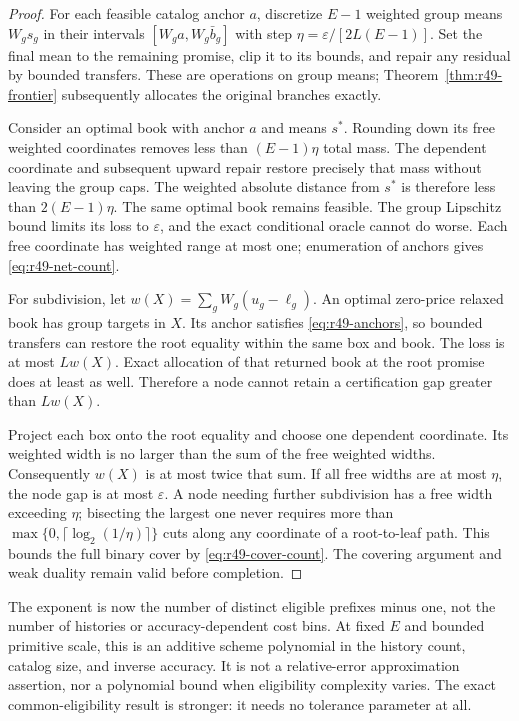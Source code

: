 \begin{proof}
For each feasible catalog anchor $a$, discretize $E-1$ weighted group means $W_gs_g$ in their intervals $[W_ga,W_g\bar b_g]$ with step $\eta=\varepsilon/[2L(E-1)]$. Set the final mean to the remaining promise, clip it to its bounds, and repair any residual by bounded transfers. These are operations on group means; Theorem~\ref{thm:r49-frontier} subsequently allocates the original branches exactly.

Consider an optimal book with anchor $a$ and means $s^*$. Rounding down its free weighted coordinates removes less than $(E-1)\eta$ total mass. The dependent coordinate and subsequent upward repair restore precisely that mass without leaving the group caps. The weighted absolute distance from $s^*$ is therefore less than $2(E-1)\eta$. The same optimal book remains feasible. The group Lipschitz bound limits its loss to $\varepsilon$, and the exact conditional oracle cannot do worse. Each free coordinate has weighted range at most one; enumeration of anchors gives \eqref{eq:r49-net-count}.

For subdivision, let $w(X)=\sum_gW_g(u_g-\ell_g)$. An optimal zero-price relaxed book has group targets in $X$. Its anchor satisfies \eqref{eq:r49-anchors}, so bounded transfers can restore the root equality within the same box and book. The loss is at most $Lw(X)$. Exact allocation of that returned book at the root promise does at least as well. Therefore a node cannot retain a certification gap greater than $Lw(X)$.

Project each box onto the root equality and choose one dependent coordinate. Its weighted width is no larger than the sum of the free weighted widths. Consequently $w(X)$ is at most twice that sum. If all free widths are at most $\eta$, the node gap is at most $\varepsilon$. A node needing further subdivision has a free width exceeding $\eta$; bisecting the largest one never requires more than $\max\{0,\lceil\log_2(1/\eta)\rceil\}$ cuts along any coordinate of a root-to-leaf path. This bounds the full binary cover by \eqref{eq:r49-cover-count}. The covering argument and weak duality remain valid before completion.\end{proof}

The exponent is now the number of distinct eligible prefixes minus one, not the number of histories or accuracy-dependent cost bins. At fixed $E$ and bounded primitive scale, this is an additive scheme polynomial in the history count, catalog size, and inverse accuracy. It is not a relative-error approximation assertion, nor a polynomial bound when eligibility complexity varies. The exact common-eligibility result is stronger: it needs no tolerance parameter at all.

